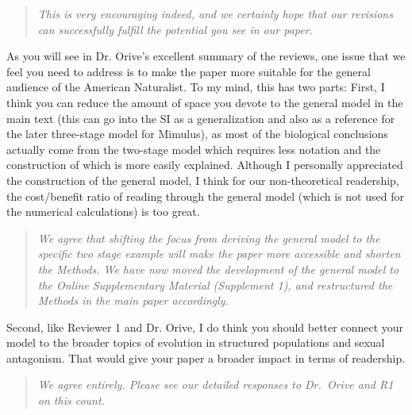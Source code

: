 \documentclass[11pt]{article}
\begin{document}
\begin{quote}
	{\itshape This is very encouraging indeed, and we certainly hope that our revisions can successfully fulfill the potential you see in our paper.}
\end{quote}

As you will see in Dr. Orive’s excellent summary of the reviews, one issue that we feel you need to address is to make the paper more suitable for the general audience of the American Naturalist. To my mind, this has two parts: First, I think you can reduce the amount of space you devote to the general model in the main text (this can go into the SI as a generalization and also as a reference for the later three-stage model for Mimulus), as most of the biological conclusions actually come from the two-stage model which requires less notation and the construction of which is more easily explained. Although I personally appreciated the construction of the general model, I think for our non-theoretical readership, the cost/benefit ratio of reading through the general model (which is not used for the numerical calculations) is too great. 

\begin{quote}
	{\itshape We agree that shifting the focus from deriving the general model to the specific two stage example will make the paper more accessible and shorten the Methods. We have now moved the development of the general model to the Online Supplementary Material (Supplement 1), and restructured the Methods in the main paper accordingly. }
\end{quote}

Second, like Reviewer 1 and Dr. Orive, I do think you should better connect your model to the broader topics of evolution in structured populations and sexual antagonism. That would give your paper a broader impact in terms of readership.

\begin{quote}
	{\itshape We agree entirely. Please see our detailed responses to Dr.~Orive and R1 on this count.}
\end{quote}
\end{document}
